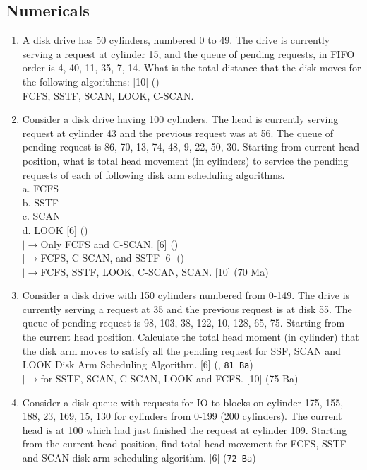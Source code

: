 \documentclass[12pt]{article}
\newcommand{\lb}{\\$\left|\rightarrow\right.$}
\begin{document}
	\subsection{Numericals}
		\begin{enumerate}
			\item A disk drive has 50 cylinders, numbered 0 to 49. The drive is currently serving a request at cylinder 15, and the queue of pending requests, in FIFO order is 4, 40, 11, 35, 7, 14. What is the total distance that the disk moves for the following algorithms: \hfill [10] ()\\
			FCFS, SSTF, SCAN, LOOK, C-SCAN.
			
			\item Consider a disk drive having 100 cylinders. The head is currently serving request at cylinder 43 and the previous request was at 56. The queue of pending request is 86, 70, 13, 74, 48, 9, 22, 50, 30. Starting from current head position, what is total head movement (in cylinders) to service the pending requests of each of following disk arm scheduling algorithms.\\
			a. FCFS\\
			b. SSTF\\
			c. SCAN\\
			d. LOOK \hfill [6] ()
			\lb Only FCFS and C-SCAN. \hfill [6] ()
			\lb FCFS, C-SCAN, and SSTF \hfill [6] ()
			\lb FCFS, SSTF, LOOK, C-SCAN, SCAN. \hfill [10] (70 Ma)

			\item Consider a disk drive with 150 cylinders numbered from 0-149. The drive is currently serving a request at 35 and the previous request is at disk 55. The queue of pending request is 98, 103, 38, 122, 10, 128, 65, 75. Starting from the current head position. Calculate the total head moment (in cylinder) that the disk arm moves to satisfy all the pending request for SSF, SCAN and LOOK Disk Arm Scheduling Algorithm. \hfill [6] (, \texttt{81 Ba})
			\lb for SSTF, SCAN, C-SCAN, LOOK and FCFS. \hfill [10] (75 Ba)
			
			\item Consider a disk queue with requests for IO to blocks on cylinder 175, 155, 188, 23, 169, 15, 130 for cylinders from 0-199 (200 cylinders). The current head is at 100 which had just finished the request at cylinder 109. Starting from the current head position, find total head movement for FCFS, SSTF and SCAN disk arm scheduling algorithm. \hfill [6] (\texttt{72 Ba})
 

\end{enumerate}
\end{document}
